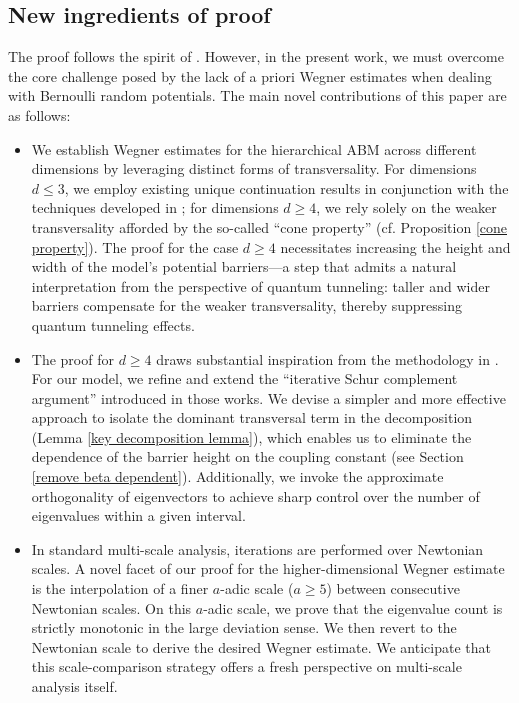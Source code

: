 \documentclass[11pt,reqno,UTF8,twoside]{amsart}
\theoremstyle{definition}
\numberwithin{equation}{section}
\begin{document}
\subsection{New ingredients of proof}

The proof follows the spirit of \cite{FS83, FMSS85}. However, in the present work, we must overcome the core challenge posed by the lack of a priori Wegner estimates when dealing with Bernoulli random potentials. The main novel contributions of this paper are as follows:

\begin{itemize}
  \item We establish Wegner estimates for the hierarchical ABM across different dimensions by leveraging distinct forms of transversality. For dimensions $d\le 3$, we employ existing unique continuation results in conjunction with the techniques developed in \cite{DS20}; for dimensions $d\ge 4$, we rely solely on the weaker transversality afforded by the so-called ``cone property'' (cf. Proposition \ref{cone property}). The proof for the case $d\ge 4$ necessitates increasing the height and width of the model’s potential barriers—a step that admits a natural interpretation from the perspective of quantum tunneling: taller and wider barriers compensate for the weaker transversality, thereby suppressing quantum tunneling effects.  
  
  
  
  
   
  \item The proof for $d\ge 4$ draws substantial inspiration from the methodology in \cite{IM16,Imb21}. For our model, we refine and extend the ``iterative Schur complement argument'' introduced in those works. We devise a simpler and more effective approach to isolate the dominant transversal term in the decomposition (Lemma \ref{key decomposition lemma}), which enables us to eliminate the dependence of the barrier height on the coupling constant (see Section \ref{remove beta dependent}). Additionally, we invoke the approximate orthogonality of eigenvectors to achieve sharp control over the number of eigenvalues within a given interval.   
  
  
  
  \item In standard multi-scale analysis, iterations are performed over Newtonian scales. A novel facet of our proof for the higher-dimensional Wegner estimate is the interpolation of a finer 
$a$-adic scale ($a\ge 5$) between consecutive Newtonian scales. On this $a$-adic scale, we prove that the eigenvalue count is strictly monotonic in the large deviation sense. We then revert to the Newtonian scale to derive the desired Wegner estimate. We anticipate that this scale-comparison strategy offers a fresh perspective on multi-scale analysis itself.  
  

\end{itemize}
\end{document}
